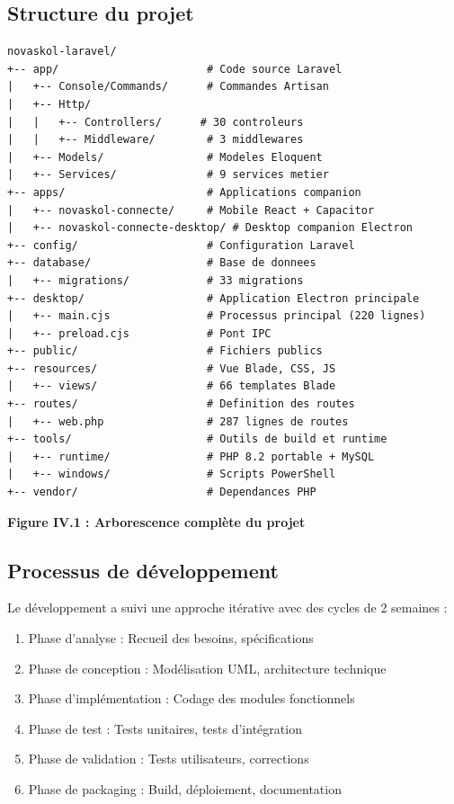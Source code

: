 \documentclass[12pt,a4paper,twoside]{report}
\begin{document}
\subsection{Structure du projet}

\begin{verbatim}
novaskol-laravel/
+-- app/                       # Code source Laravel
|   +-- Console/Commands/      # Commandes Artisan
|   +-- Http/
|   |   +-- Controllers/      # 30 controleurs
|   |   +-- Middleware/        # 3 middlewares
|   +-- Models/                # Modeles Eloquent
|   +-- Services/              # 9 services metier
+-- apps/                      # Applications companion
|   +-- novaskol-connecte/     # Mobile React + Capacitor
|   +-- novaskol-connecte-desktop/ # Desktop companion Electron
+-- config/                    # Configuration Laravel
+-- database/                  # Base de donnees
|   +-- migrations/            # 33 migrations
+-- desktop/                   # Application Electron principale
|   +-- main.cjs               # Processus principal (220 lignes)
|   +-- preload.cjs            # Pont IPC
+-- public/                    # Fichiers publics
+-- resources/                 # Vue Blade, CSS, JS
|   +-- views/                 # 66 templates Blade
+-- routes/                    # Definition des routes
|   +-- web.php                # 287 lignes de routes
+-- tools/                     # Outils de build et runtime
|   +-- runtime/               # PHP 8.2 portable + MySQL
|   +-- windows/               # Scripts PowerShell
+-- vendor/                    # Dependances PHP
\end{verbatim}

\begin{center}
\textbf{Figure IV.1 : Arborescence complète du projet}
\end{center}

\subsection{Processus de développement}

Le développement a suivi une approche itérative avec des cycles de 2 semaines :
\begin{enumerate}
    \item Phase d'analyse : Recueil des besoins, spécifications
    \item Phase de conception : Modélisation UML, architecture technique
    \item Phase d'implémentation : Codage des modules fonctionnels
    \item Phase de test : Tests unitaires, tests d'intégration
    \item Phase de validation : Tests utilisateurs, corrections
    \item Phase de packaging : Build, déploiement, documentation
\end{enumerate}
\end{document}
